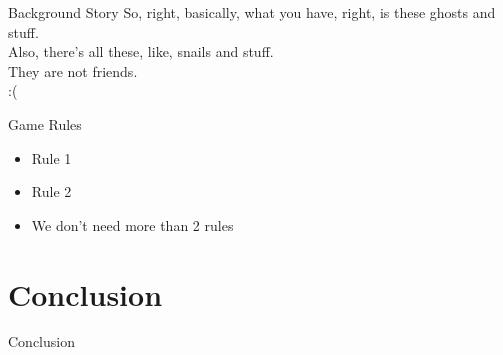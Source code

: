\documentclass{beamer}
\begin{document}
\begin{frame}{Background Story}
  So, right, basically, what you have, right, is these ghosts and stuff. \\
  \vspace{\baselineskip}
  Also, there's all these, like, snails and stuff. \\
  \vspace{\baselineskip}
  They are not friends. \\
  \vspace{\baselineskip}
  :(
\end{frame}

\begin{frame}{Game Rules}
  \begin{itemize}
    \item Rule 1
    \item Rule 2
    \item We don't need more than 2 rules
  \end{itemize}
\end{frame}


\section{Conclusion}

\begin{frame}{Conclusion}
\end{frame}
\end{document}

